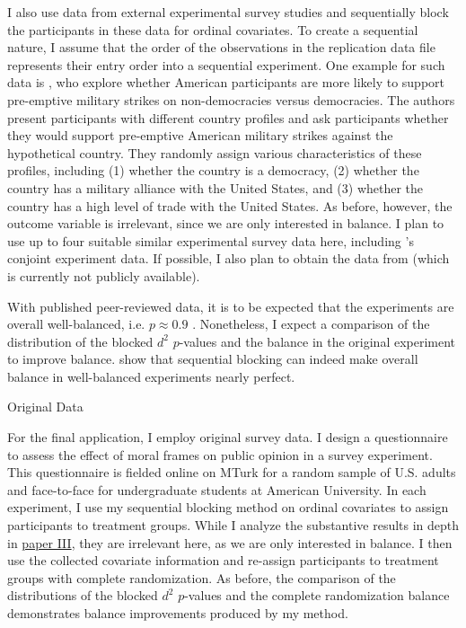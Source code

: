 \documentclass[12pt,]{article}
\makeatletter
\renewcommand\subsubsection{\@startsection{subsubsection}{3}{\z@}
                                     {-3.25ex\@plus -1ex \@minus -.2ex}
                                     {1.5ex \@plus .2ex}
                                     {\normalsize\itshape}} %
\makeatother
\begin{document}
I also use data from external experimental survey studies and
sequentially block the participants in these data for ordinal
covariates. To create a sequential nature, I assume that the order of
the observations in the replication data file represents their entry
order into a sequential experiment. One example for such data is
\citet{tomz_2013_public}, who explore whether American participants are
more likely to support pre-emptive military strikes on non-democracies
versus democracies. The authors present participants with different
country profiles and ask participants whether they would support
pre-emptive American military strikes against the hypothetical country.
They randomly assign various characteristics of these profiles,
including (1) whether the country is a democracy, (2) whether the
country has a military alliance with the United States, and (3) whether
the country has a high level of trade with the United States. As before,
however, the outcome variable is irrelevant, since we are only
interested in balance. I plan to use up to four suitable similar
experimental survey data here, including
\citet{hainmueller_2014_causal}'s conjoint experiment data. If possible,
I also plan to obtain the data from \citet{chong_framing_2007} (which is
currently not publicly available).

With published peer-reviewed data, it is to be expected that the
experiments are overall well-balanced, i.e. \(p \approx 0.9\)
\citep{moore_blocking_2013}. Nonetheless, I expect a comparison of the
distribution of the blocked \(d^2\) \(p\)-values and the balance in the
original experiment to improve balance. \citet{moore_blocking_2013} show
that sequential blocking can indeed make overall balance in
well-balanced experiments nearly perfect.

\subsubsection{Original Data}\label{seq-data-original}

For the final application, I employ original survey data. I design a
questionnaire to assess the effect of moral frames on public opinion in
a survey experiment. This questionnaire is fielded online on MTurk for a
random sample of U.S. adults and face-to-face for undergraduate students
at American University. In each experiment, I use my sequential blocking
method on ordinal covariates to assign participants to treatment groups.
While I analyze the substantive results in depth in
\protect\hyperlink{paper-iii-moral-arguments-as-a-source-of-frame-strength}{paper
III}, they are irrelevant here, as we are only interested in balance. I
then use the collected covariate information and re-assign participants
to treatment groups with complete randomization. As before, the
comparison of the distributions of the blocked \(d^2\) \(p\)-values and
the complete randomization balance demonstrates balance improvements
produced by my method.
\end{document}
